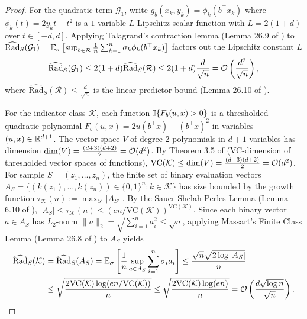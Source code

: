 \begin{proof}
For the quadratic term $\mathcal{G}_1$, write $g_b(x_k, y_k) = \phi_k(b^\top x_k)$ where $\phi_k(t) = 2y_k t - t^2$ is a $1$-variable $L$-Lipschitz scalar function with $L = 2(1+d)$ over $t \in [-d, d]$. Applying Talagrand's contraction lemma (Lemma 26.9 of \citealp{shalevshwartz2014understanding}) to $\widehat{\mathrm{Rad}}_S(\mathcal{G}_1) = \mathbb{E}_\sigma \left[ \sup_{b \in \mathcal{R}} \frac{1}{n}\sum_{k=1}^n \sigma_k \phi_k(b^\top x_k) \right]$ factors out the Lipschitz constant $L$
\begin{equation*}
    \widehat{\mathrm{Rad}}_S(\mathcal{G}_1) \le 2(1+d) \widehat{\mathrm{Rad}}_S(\mathcal{R}) \le 2(1+d)\frac{d}{\sqrt{n}} = \mathcal{O}\left( \frac{d^2}{\sqrt{n}} \right),
\end{equation*}
where $\widehat{\mathrm{Rad}}_S(\mathcal{R}) \le \frac{d}{\sqrt{n}}$ is the linear predictor bound (Lemma 26.10 of \citealp{shalevshwartz2014understanding}).

For the indicator class $\mathcal{K}$, each function $\mathbb{I}\{F_b(u, x) > 0\}$ is a thresholded quadratic polynomial $F_b(u, x) = 2 u (b^\top x) - (b^\top x)^2$ in variables $(u, x) \in \mathbb{R}^{d+1}$. The vector space $V$ of degree-2 polynomials in $d+1$ variables has dimension $\dim(V) = \frac{(d+3)(d+2)}{2} = \mathcal{O}(d^2)$. By Theorem 3.5 of \citet{anthony1999neural} (VC-dimension of thresholded vector spaces of functions), $\mathrm{VC}(\mathcal{K}) \le \dim(V) = \frac{(d+3)(d+2)}{2} = \mathcal{O}(d^2)$. For sample $S = (z_1, \dots, z_n)$, the finite set of binary evaluation vectors $A_S = \{ (k(z_1), \dots, k(z_n)) \in \{0, 1\}^n : k \in \mathcal{K} \}$ has size bounded by the growth function $\tau_{\mathcal{K}}(n) := \max_{S'} |A_{S'}|$. By the Sauer-Shelah-Perles Lemma (Lemma 6.10 of \citealp{shalevshwartz2014understanding}), $|A_S| \le \tau_{\mathcal{K}}(n) \le (en / \mathrm{VC}(\mathcal{K}))^{\mathrm{VC}(\mathcal{K})}$. Since each binary vector $a \in A_S$ has $L_2$-norm $\|a\|_2 = \sqrt{\sum_{i=1}^n a_i^2} \le \sqrt{n}$, applying Massart's Finite Class Lemma (Lemma 26.8 of \citealp{shalevshwartz2014understanding}) to $A_S$ yields
\begin{equation*}
    \begin{aligned}
    \widehat{\mathrm{Rad}}_S(\mathcal{K}) &= \widehat{\mathrm{Rad}}_S(A_S) = \mathbb{E}_\sigma \left[ \frac{1}{n}\sup_{a \in A_S} \sum_{i=1}^n \sigma_i a_i \right] \le \frac{\sqrt{n}\sqrt{2 \log |A_S|}}{n} \\
    &\le \sqrt{\frac{2 \mathrm{VC}(\mathcal{K}) \log(en / \mathrm{VC}(\mathcal{K}))}{n}} \le \sqrt{\frac{2 \mathrm{VC}(\mathcal{K}) \log(en)}{n}} = \mathcal{O}\left( \frac{d \sqrt{\log n}}{\sqrt{n}} \right).
    \end{aligned}
\end{equation*}


\end{proof}
